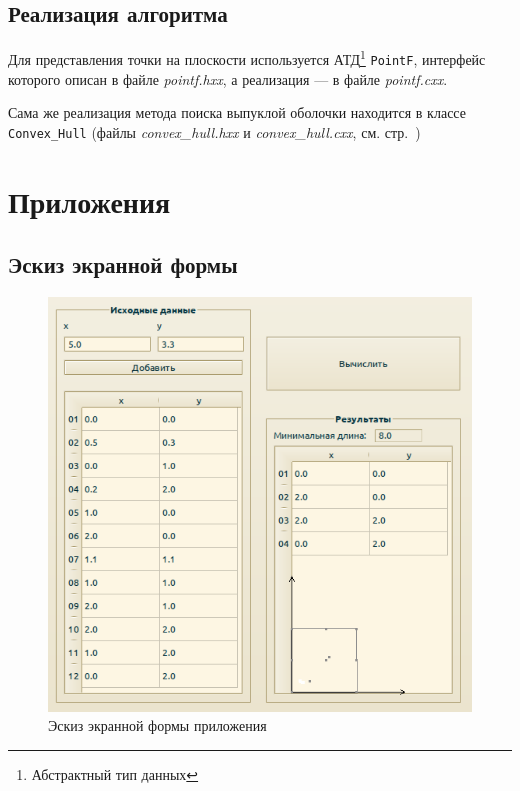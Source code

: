 \documentclass[a4paper,12pt,notitlepage,headsepline,pdftex]{scrartcl}
\begin{document}
  \subsection{Реализация алгоритма}
    Для представления точки на плоскости используется АТД\footnote{Абстрактный тип
    данных} \texttt{PointF}, интерфейс которого описан в файле
    \textit{pointf.hxx}, а реализация --- в файле \textit{pointf.cxx}.

    Сама же реализация метода поиска выпуклой оболочки находится в классе
    \texttt{Convex\_Hull} (файлы \textit{convex\_hull.hxx} и
    \textit{convex\_hull.cxx}, см. стр.~\pageref{sec:apcode})
    \newpage

\section*{Приложения}
  \subsection*{Эскиз экранной формы}
    \begin{figure}[h]
      \begin{center}
        \includegraphics[scale=0.6]{scr.png}
      \end{center}
      \caption{Эскиз экранной формы приложения}
      \label{fig:scr}
    \end{figure}
    \clearpage
\end{document}

